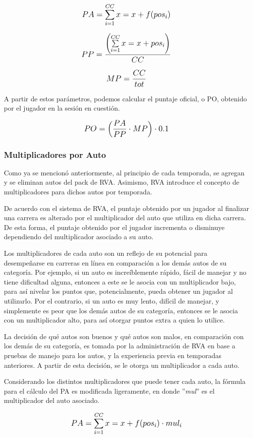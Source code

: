 \[
\mathlarger{{PA} = \sum_{i=1}^{CC}x=x+f(pos_i)}
\]

\[
\mathlarger{{PP} = \frac{\left(\sum\limits_{i=1}^{CC}x=x+pos_i\right)}{CC}}
\]

\[
\mathlarger{{MP} = \frac{CC}{tot}}
\]

A partir de estos parámetros, podemos calcular el puntaje oficial, o PO, obtenido por el jugador en la sesión en cuestión.

\[
\mathlarger{{PO} = \left(\frac{PA}{PP} \cdot MP\right) \cdot 0.1}
\]

\subsubsection{Multiplicadores por Auto}
Como ya se mencionó anteriormente, al principio de cada temporada, se agregan y se eliminan autos del pack de RVA. Asimismo, RVA introduce el concepto de multiplicadores para dichos autos por temporada.

De acuerdo con el sistema de RVA, el puntaje obtenido por un jugador al finalizar una carrera es alterado por el multiplicador del auto que utiliza en dicha carrera. De esta forma, el puntaje obtenido por el jugador incrementa o disminuye dependiendo del multiplicador asociado a su auto.

Los multiplicadores de cada auto son un reflejo de su potencial para desempeñarse en carreras en línea en comparación a los demás autos de su categoría. Por ejemplo, si un auto es increíblemente rápido, fácil de manejar y no tiene dificultad alguna, entonces a este se le asocia con un multiplicador bajo, para así nivelar los puntos que, potencialmente, pueda obtener un jugador al utilizarlo. Por el contrario, si un auto es muy lento, difícil de manejar, y simplemente es peor que los demás autos de su categoría, entonces se le asocia con un multiplicador alto, para así otorgar puntos extra a quien lo utilice.

La decisión de qué autos son buenos y qué autos son malos, en comparación con los demás de su categoría, es tomada por la administración de RVA en base a pruebas de manejo para los autos, y la experiencia previa en temporadas anteriores. A partir de esta decisión, se le otorga un multiplicador a cada auto.

Considerando los distintos multiplicadores que puede tener cada auto, la fórmula para el cálculo del PA es modificada ligeramente, en donde ''\textit{mul}'' es el multiplicador del auto asociado.

\[
\mathlarger{{PA} = \sum_{i=1}^{CC}x=x+f(pos_i) \cdot mul_i}
\]

